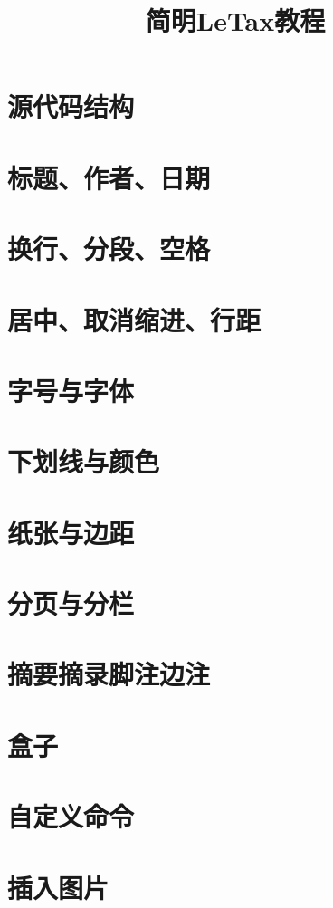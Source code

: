 \documentclass[12pt,a4paper]{ctexart}  %
\title{简明LeTax教程}      %
\author{}                 %
\date{}                   %
\begin{document}
\maketitle                    %
\clearpage                    %

\tableofcontents              %
\clearpage                   %

\section{源代码结构}          %
\section{标题、作者、日期}  %
\section{换行、分段、空格}
\section{居中、取消缩进、行距}
\section{字号与字体}
\section{下划线与颜色}
\section{纸张与边距}
\section{分页与分栏}
\section{摘要摘录脚注边注}
\section{盒子}
\section{自定义命令}
\section{插入图片}
\end{document}
